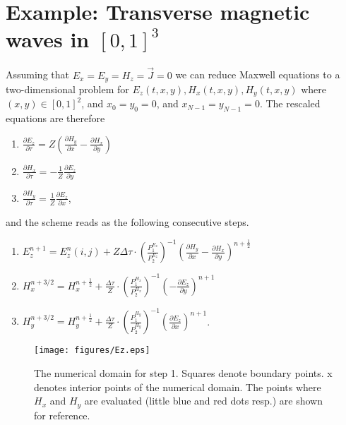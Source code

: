 \documentclass[12pt,reqno]{amsart}
\theoremstyle{definition}
\numberwithin{equation}{section}
\begin{document}
	
	
	\section{Example: Transverse magnetic waves  in $[0,1]^3$}\label{sec:TE}
	Assuming that $E_x=E_y=H_z=\vec{J}=0$ we can reduce Maxwell equations to a two-dimensional problem for $E_z(t,x,y), H_x(t,x,y), H_y(t,x,y)$ where  $(x,y)\in[0,1]^2$, and
	$x_0=y_0=0$, and $x_{N-1}=y_{N-1}=0$.
	The rescaled equations are therefore 
	
	\begin{enumerate}
		\item  $ \frac{\partial E_z}{\partial \tau }=Z\left (
		\frac{\partial H_y}{\partial x}-\frac{\partial H_x}{\partial y}
		\right)$
		\item 	  $ \frac{\partial H_x}{\partial \tau }=-\frac{1}{Z}\frac{\partial E_z}{\partial y}$
		\item 	  $ \frac{\partial H_y}{\partial \tau }=\frac{1}{Z}\frac{\partial E_z}{\partial x}$,
		
	\end{enumerate}
	and the scheme  reads as the following consecutive steps.
	\begin{enumerate}
		\item  $ E_z^{n+1}=E_z^n(i,j)+Z\Delta \tau \cdot 
		\left(\frac{P_1^{E_z}}{P_2^{E_z}}\right)^{-1}
		\left (\frac{\partial H_y}{\partial x}-
		\frac{\partial H_x}{\partial y}
		\right)^{n+\frac{1}{2}}$\\[1mm]
		\item $ H_x^{n+3/2}=H_x^{n+\frac{1}{2}}+\frac{\Delta \tau}{Z} \cdot  \left(\frac{P_1^{H_x}}{P_2^{H_x}}\right)^{-1}\left (-
		\frac{\partial E_z}{\partial y}
		\right)^{n+1} $\\[1mm]
		\item $ H_y^{n+3/2}=H_y^{n+\frac{1}{2}}+\frac{\Delta \tau}{Z} \cdot  \left(\frac{P_1^{H_y}}{P_2^{H_y}}\right)^{-1}\left (
		\frac{\partial E_z}{\partial x}
		\right)^{n+1} $.
	\end{enumerate}
	\begin{figure}[!t]
		\centering
		\texttt{[image: figures/Ez.eps]}
		\caption{
			The numerical domain for step 1.
			Squares denote boundary points. x denotes interior points of the numerical domain.  The points where $H_x$ and $H_y$ are evaluated (little blue and red dots resp.) are shown for reference.}
		\label{fig:E}
		
	\end{figure}
	
\end{document}
